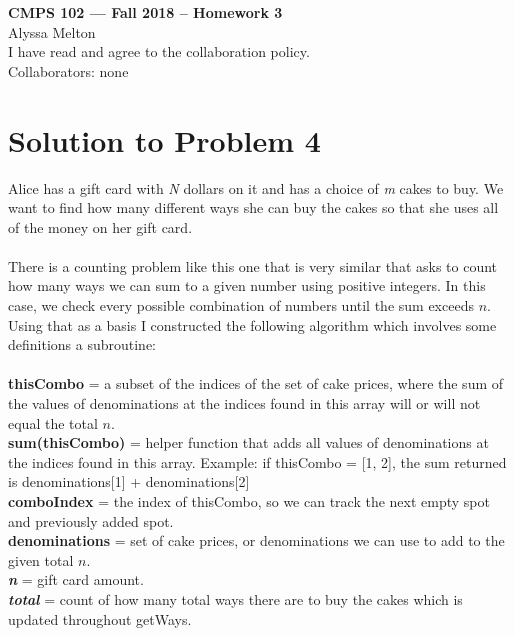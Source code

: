 \documentclass[11pt]{article}
\begin{document}
	
	\begin{center}
		{\bf\Large CMPS 102 --- Fall 2018 --  Homework 3}\\
		Alyssa Melton\\
		I have read and agree to the collaboration policy. \\
		Collaborators: none\\
	\end{center}
	
	
	\section*{Solution to Problem 4}
	Alice has a gift card with \textit{N} dollars on it and has a choice of \textit{m} cakes to buy. We want to find how many different ways she can buy the cakes so that she uses all of the money on her gift card. \\
	\\
	There is a counting problem like this one that is very similar that asks to count how many ways we can sum to a given number using positive integers. In this case, we check every possible combination of numbers until the sum exceeds $n$. Using that as a basis I constructed the following algorithm which involves some definitions a subroutine:\\
	\\
 	\textbf{thisCombo} = 
 	a subset of the indices of the set of cake prices, where the sum of the values of denominations at the indices found in this array will or will not equal the total $n$.
 	\\
 	\textbf{sum(thisCombo)} = 
 	helper function that adds all values of denominations at the indices found in this array. Example: if thisCombo = [1, 2], the sum returned is denominations[1] + denominations[2]
 	\\
 	\textbf{comboIndex} = the index of thisCombo, so we can track the next empty spot and previously added spot.
 	\\
 	\textbf{denominations} =
 	set of cake prices, or denominations we can use to add to the given total $n$.
 	\\
 	\textbf{\textit{n}} = gift card amount.
 	\\
 	\textbf{\textit{total}} =
 	count of how many total ways there are to buy the cakes which is updated throughout getWays.
\end{document}
